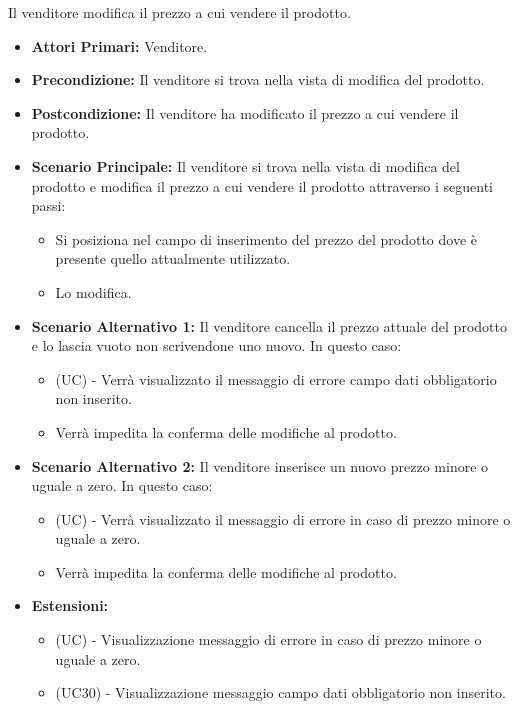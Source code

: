 Il venditore modifica il prezzo a cui vendere il prodotto.
\begin{itemize}
    \item \textbf{Attori Primari:} Venditore.
    \item \textbf{Precondizione:} Il venditore si trova nella vista di modifica del prodotto.
    \item \textbf{Postcondizione:} Il venditore ha modificato il prezzo a cui vendere il prodotto.
    \item \textbf{Scenario Principale:} Il venditore si trova nella vista di modifica del prodotto e modifica il prezzo a cui vendere il prodotto attraverso i seguenti passi:
    \begin{itemize}
        \item Si posiziona nel campo di inserimento del prezzo del prodotto dove è presente quello attualmente utilizzato.
        \item Lo modifica.
    \end{itemize}
    \item \textbf{Scenario Alternativo 1:} Il venditore cancella il prezzo attuale del prodotto e lo lascia vuoto non scrivendone uno nuovo. In questo caso:
    \begin{itemize}
        \item (UC) - Verrà visualizzato il messaggio di errore campo dati obbligatorio non inserito.
        \item Verrà impedita la conferma delle modifiche al prodotto.
    \end{itemize}
    \item \textbf{Scenario Alternativo 2:} Il venditore inserisce un nuovo prezzo minore o uguale a zero. In questo caso:
    \begin{itemize}
        \item (UC) - Verrà visualizzato il messaggio di errore in caso di prezzo minore o uguale a zero.
        \item Verrà impedita la conferma delle modifiche al prodotto.
    \end{itemize}
    \item \textbf{Estensioni:}
        \begin{itemize}
            \item (UC) - Visualizzazione messaggio di errore in caso di prezzo minore o uguale a zero.
            \item (UC30) - Visualizzazione messaggio campo dati obbligatorio non inserito.
        \end{itemize}
\end{itemize}

